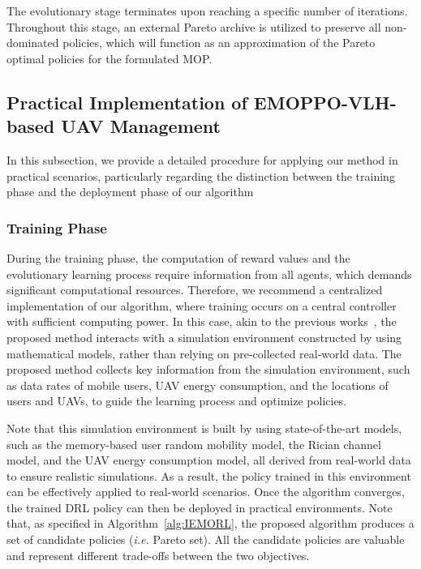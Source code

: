 \documentclass[10pt,journal,compsoc]{IEEEtran}
\begin{document}
\par The evolutionary stage terminates upon reaching a specific number of iterations. Throughout this stage, an external Pareto archive is utilized to preserve all non-dominated policies, which will function as an approximation of the Pareto optimal policies for the formulated MOP. 


\subsection{Practical Implementation of EMOPPO-VLH-based UAV Management}

\par In this subsection, we provide a detailed procedure for applying our method in practical scenarios, particularly regarding the distinction between the training phase and the deployment phase of our algorithm

\subsubsection{Training Phase}

\par During the training phase, the computation of reward values and the evolutionary learning process require information from all agents, which demands significant computational resources. Therefore, we recommend a centralized implementation of our algorithm, where training occurs on a central controller with sufficient computing power. In this case, akin to the previous works~\cite{10629203, 10574401, 10275021, Guo2024}, the proposed method interacts with a simulation environment constructed by using mathematical models, rather than relying on pre-collected real-world data. The proposed method collects key information from the simulation environment, such as data rates of mobile users, UAV energy consumption, and the locations of users and UAVs, to guide the learning process and optimize policies. 

\par Note that this simulation environment is built by using state-of-the-art models, such as the memory-based user random mobility model, the Rician channel model, and the UAV energy consumption model, all derived from real-world data to ensure realistic simulations. As a result, the policy trained in this environment can be effectively applied to real-world scenarios. Once the algorithm converges, the trained DRL policy can then be deployed in practical environments. Note that, as specified in Algorithm~\ref{alg:IEMORL}, the proposed algorithm produces a set of candidate policies (\emph{i.e.} Pareto set). All the candidate policies are valuable and represent different trade-offs between the two objectives. 
\end{document}

